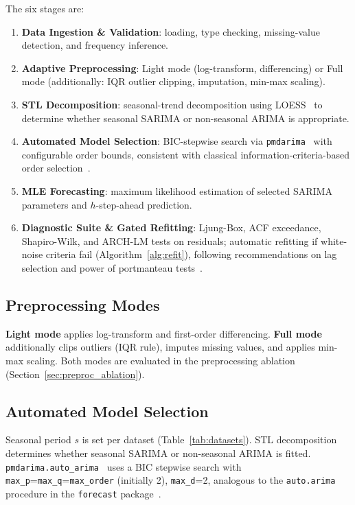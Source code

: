 \documentclass[sn-mathphys-num,pdflatex]{sn-jnl}
\begin{document}
The six stages are:
\begin{enumerate}
\item \textbf{Data Ingestion \& Validation}: loading, type checking,
missing-value detection, and frequency inference.
\item \textbf{Adaptive Preprocessing}: Light mode (log-transform,
differencing) or Full mode (additionally: IQR outlier clipping,
imputation, min-max scaling).
\item \textbf{STL Decomposition}: seasonal-trend decomposition
using LOESS~\cite{cleveland1990stl} to determine whether
seasonal SARIMA or non-seasonal ARIMA is appropriate.
\item \textbf{Automated Model Selection}: BIC-stepwise search via
\texttt{pmdarima}~\cite{pmdarima} with configurable order bounds,
consistent with classical information-criteria-based order selection~\cite{akaike1974aic, schwarz1978bic, hyndman2008forecast}.
\item \textbf{MLE Forecasting}: maximum likelihood estimation of
selected SARIMA parameters and $h$-step-ahead prediction.
\item \textbf{Diagnostic Suite \& Gated Refitting}: Ljung-Box,
ACF exceedance, Shapiro-Wilk, and ARCH-LM tests on residuals;
automatic refitting if white-noise criteria fail
(Algorithm~\ref{alg:refit}), following recommendations on lag
selection and power of portmanteau tests~\cite{ljungbox1978, hassani2020lb}.
\end{enumerate}

\subsection{Preprocessing Modes}

\textbf{Light mode} applies log-transform and first-order differencing.
\textbf{Full mode} additionally clips outliers (IQR rule), imputes
missing values, and applies min-max scaling. Both modes are
evaluated in the preprocessing ablation (Section~\ref{sec:preproc_ablation}).

\subsection{Automated Model Selection}

Seasonal period $s$ is set per dataset (Table~\ref{tab:datasets}).
STL decomposition~\cite{cleveland1990stl} determines whether seasonal
SARIMA or non-seasonal ARIMA is fitted.
\texttt{pmdarima.auto\_arima}~\cite{pmdarima} uses a BIC stepwise
search with \texttt{max\_p}=\texttt{max\_q}=\texttt{max\_order}
(initially 2), \texttt{max\_d}=2, analogous to the
\texttt{auto.arima} procedure in the \texttt{forecast} package~\cite{hyndman2008forecast}.
\end{document}
